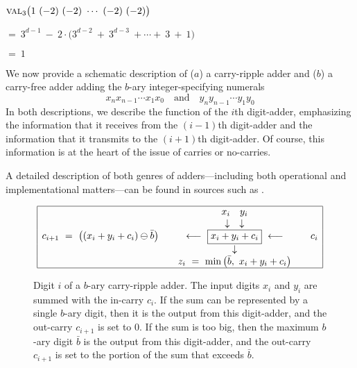 $\displaystyle \mbox{\sc val}_3 \big( 1 \ (-2) \ (-2) \ \cdots \ (-2) \ (-2) \big)$

\smallskip

\hspace*{.25in}$= \ 3^{d-1} \ - \ 2 \cdot \big(3^{d-2} \ + \ 3^{d-3}
\ + \cdots + \ 3 \ + \ 1 \big)$

\hspace*{.25in}$= \ 1$

\bigskip

We now provide a schematic description of ($a$) a carry-ripple adder
and ($b$) a carry-free adder adding the $b$-ary integer-specifying
numerals
\[ x_n x_{n-1} \cdots x_1 x_0 \ \ \ \mbox{ and } \ \ \ 
y_n y_{n-1} \cdots y_1 y_0
\]
In both descriptions, we describe the function of the $i$th
digit-adder, emphasizing the information that it receives from the
$(i-1)$th digit-adder and the information that it transmits to the
$(i+1)$th digit-adder.  Of course, this information is at the heart of
the issue of carries or no-carries.

A detailed description of both genres of adders---including both
operational and implementational matters---can be found in sources
such as \cite{Hwang79}.

\begin{figure}[hbt]
\[
\begin{array}{|lcccr|}
\hline
 & & x_i \ \ \ y_i & & \\
 & & \downarrow \ \ \ \downarrow & & \\
c_{i+1} \ = \ \big( (x_i + y_i + c_i) \ominus \bar{b} \big)
 & & \longleftarrow \ \fbox{$x_i + y_i + c_i$} \ \longleftarrow & &  c_i 
  \\
 & & \downarrow & &
  \\
 & & z_i \ = \ \min \big( \bar{b}, \ x_i + y_i + c_i \big)  & & 
  \\
\hline
\end{array}
\]
\caption{Digit $i$ of a $b$-ary carry-ripple adder.  The input digits
  $x_i$ and $y_i$ are summed with the in-carry $c_i$.  If the sum can
  be represented by a single $b$-ary digit, then it is the output from
  this digit-adder, and the out-carry $c_{i+1}$ is set to $0$.  If the
  sum is too big, then the maximum $b$-ary digit $\bar{b}$ is the
  output from this digit-adder, and the out-carry $c_{i+1}$ is set to
  the portion of the sum that exceeds $\bar{b}$.}
\label{fig:carry-ripple-digit}
\end{figure}

\bigskip


